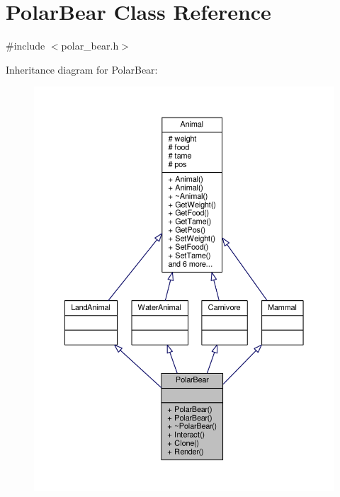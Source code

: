 \hypertarget{classPolarBear}{}\section{Polar\+Bear Class Reference}
\label{classPolarBear}


{\ttfamily \#include $<$polar\+\_\+bear.\+h$>$}



Inheritance diagram for Polar\+Bear\+:
\nopagebreak
\begin{figure}[H]
\begin{center}
\leavevmode
\includegraphics[width=350pt]{classPolarBear__inherit__graph}
\end{center}
\end{figure}


